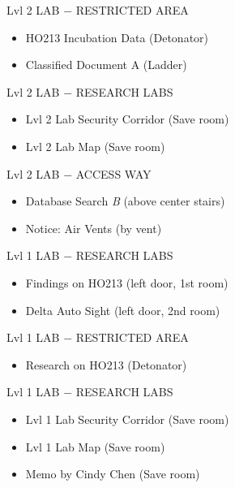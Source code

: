 \begin{subregion}{Lvl 2 LAB $\boldsymbol{-}$ RESTRICTED AREA}
    \begin{itemize}
        \item HO213 Incubation Data (Detonator)
        \item Classified Document A (Ladder)
    \end{itemize}
\end{subregion}

\begin{subregion}{Lvl 2 LAB $\boldsymbol{-}$ RESEARCH LABS}
    \begin{itemize}
        \item Lvl 2 Lab Security Corridor (Save room)
        \item Lvl 2 Lab Map (Save room)
    \end{itemize}
\end{subregion}

\begin{subregion}{Lvl 2 LAB $\boldsymbol{-}$ ACCESS WAY}
    \begin{itemize}
        \item Database Search \emph{B} (above center stairs)
        \item Notice: Air Vents (by vent)
    \end{itemize}
\end{subregion}

\begin{subregion}{Lvl 1 LAB $\boldsymbol{-}$ RESEARCH LABS}
    \begin{itemize}
        \item Findings on HO213 (left door, 1st room)
        \item Delta Auto Sight (left door, 2nd room)
    \end{itemize}
\end{subregion}

\begin{subregion}{Lvl 1 LAB $\boldsymbol{-}$ RESTRICTED AREA}
    \begin{itemize}
        \item Research on HO213 (Detonator)
    \end{itemize}
\end{subregion}

\begin{subregion}{Lvl 1 LAB $\boldsymbol{-}$ RESEARCH LABS}
    \begin{itemize}
        \item Lvl 1 Lab Security Corridor (Save room)
        \item Lvl 1 Lab Map (Save room)
        \item Memo by Cindy Chen (Save room)
    \end{itemize}
\end{subregion}
